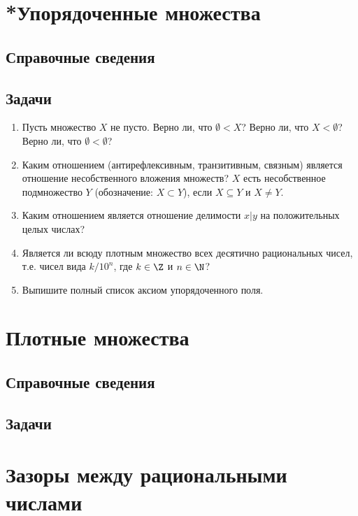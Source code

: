 \section{*Упорядоченные множества}\label{Ordering}

\subsection*{Справочные сведения}

\subsection*{Задачи}

\begin{enumerate}
\item Пусть множество $X$ не пусто. Верно ли, что $\emptyset<X$? Верно ли, что $X<\emptyset$? Верно ли, что $\emptyset<\emptyset$?
\item Каким отношением (антирефлексивным, транзитивным, связным) является отношение несобственного вложения множеств? $X$ есть несобственное подмножество $Y$ (обозначение: $X\subset Y$), если $X\subseteq Y$ и $X\ne Y$.
\item Каким отношением является отношение делимости $x|y$ на положительных целых числах?
\item Является ли всюду плотным множество всех десятично рациональных чисел, т.е. чисел вида $k/10^n$, где $k\in \Z$ и $n\in\N$?
\item Выпишите полный список аксиом упорядоченного поля.
\end{enumerate}


\section{Плотные множества}

\subsection*{Справочные сведения}

\subsection*{Задачи}



\section{Зазоры между рациональными числами}

